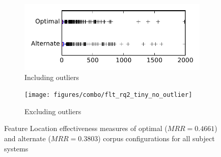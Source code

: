 
\begin{figure}
    \centering
    \begin{subfigure}{.4\textwidth}
        \centering
        \includegraphics[height=0.4\textheight]{figures/combo/flt_rq2_tiny}
        \caption{Including outliers}\label{fig:combo:flt:rq2:tiny_outlier}
    \end{subfigure}%
    \begin{subfigure}{.4\textwidth}
        \centering
        \texttt{[image: figures/combo/flt\_rq2\_tiny\_no\_outlier]}
        \caption{Excluding outliers}\label{fig:combo:flt:rq2:tiny_no_outlier}
    \end{subfigure}
\caption{Feature Location effectiveness measures of optimal ($MRR=0.4661$) and alternate ($MRR=0.3803$) corpus configurations for all subject systems}
\label{fig:combo:flt:rq2:tiny}
\end{figure}

